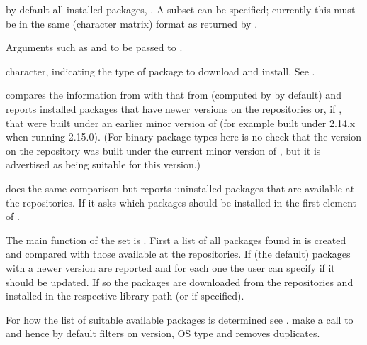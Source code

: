 \begin{Arguments}
\begin{ldescription}
\item[\code{instPkgs}] 
by default all installed packages,
.  A subset can be 
specified; currently this must be in the same (character matrix)
format as returned by .

\item[\code{...}] 
Arguments such as  and  to be
passed to .

\item[\code{type}] character, indicating the type of package to download and
install.  See .

\end{ldescription}
\end{Arguments}
%
\begin{Details}\relax
{} compares the information from
 with that from  (computed by
 by default) and reports installed
packages that have newer versions on the repositories or, if
, that were built under an earlier minor
version of \R{} (for example built under 2.14.x when running \R{} 2.15.0).
(For binary package types here is no check that the version on the
repository was built under the current minor version of \R{},
but it is advertised as being suitable for this version.) 

 does the same comparison but reports uninstalled
packages that are available at the repositories.  If  it asks which packages should be installed in the first element
of .

The main function of the set is .  First a list
of all packages found in  is created and compared with
those available at the repositories.  If  (the
default) packages with a newer version are reported and for each one
the user can specify if it should be updated.  If so the packages are
downloaded from the repositories and installed in the respective
library path (or  if specified).

For how the list of suitable available packages is determined see
.   make a call
to 
and hence by default filters on \R{} version, OS type and removes
duplicates.
\end{Details}
